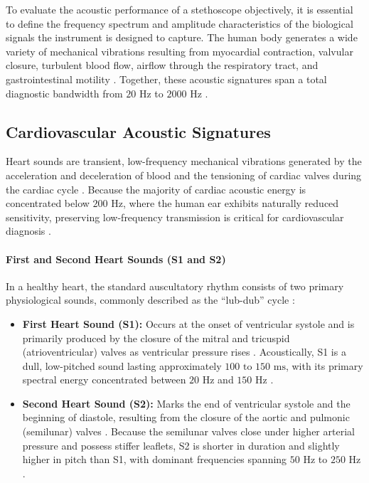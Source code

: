 To evaluate the acoustic performance of a stethoscope objectively, it is essential to define the frequency spectrum and amplitude characteristics of the biological signals the instrument is designed to capture. The human body generates a wide variety of mechanical vibrations resulting from myocardial contraction, valvular closure, turbulent blood flow, airflow through the respiratory tract, and gastrointestinal motility \cite{leng2015electronic, webster2010medical}. Together, these acoustic signatures span a total diagnostic bandwidth from $20\text{ Hz}$ to $2000\text{ Hz}$ \cite{ertel1966stethoscope, leng2015electronic}.

\subsection{Cardiovascular Acoustic Signatures}

Heart sounds are transient, low-frequency mechanical vibrations generated by the acceleration and deceleration of blood and the tensioning of cardiac valves during the cardiac cycle \cite{leng2015electronic, webster2010medical}. Because the majority of cardiac acoustic energy is concentrated below $200\text{ Hz}$, where the human ear exhibits naturally reduced sensitivity, preserving low-frequency transmission is critical for cardiovascular diagnosis \cite{ertel1966stethoscope, leng2015electronic}.

\paragraph{First and Second Heart Sounds (S1 and S2)}
In a healthy heart, the standard auscultatory rhythm consists of two primary physiological sounds, commonly described as the ``lub-dub'' cycle \cite{leng2015electronic}:
\begin{itemize}
    \item \textbf{First Heart Sound (S1):} Occurs at the onset of ventricular systole and is primarily produced by the closure of the mitral and tricuspid (atrioventricular) valves as ventricular pressure rises \cite{webster2010medical}. Acoustically, S1 is a dull, low-pitched sound lasting approximately $100\text{ to }150\text{ ms}$, with its primary spectral energy concentrated between $20\text{ Hz}$ and $150\text{ Hz}$ \cite{leng2015electronic}.
    \item \textbf{Second Heart Sound (S2):} Marks the end of ventricular systole and the beginning of diastole, resulting from the closure of the aortic and pulmonic (semilunar) valves \cite{webster2010medical}. Because the semilunar valves close under higher arterial pressure and possess stiffer leaflets, S2 is shorter in duration and slightly higher in pitch than S1, with dominant frequencies spanning $50\text{ Hz}$ to $250\text{ Hz}$ \cite{leng2015electronic}.
\end{itemize}

